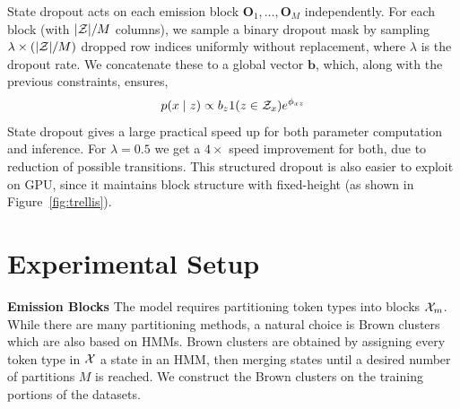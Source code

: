 \documentclass[11pt,a4paper]{article}
\begin{document}
State dropout acts on each emission block $\mathbf{O}_1, \ldots, \mathbf{O}_M$ independently.
For each block (with $|{\cal Z}| / M$ columns), we sample a binary dropout mask by sampling
$ \lambda \times(|{\cal Z}| / M)$ dropped row indices uniformly without replacement,
where $\lambda$ is the dropout rate.
We concatenate these to a global vector $\mathbf{b}$, which, along with the previous constraints, 
ensures,
\begin{equation}
\label{eqn:state_dropout}
p(x \mid z) \propto b_{z}1(z \in \mathcal{Z}_x)e^{\phi_{xz}}
\end{equation}
State dropout gives a large practical speed up for both parameter computation and inference.
For $\lambda=0.5$ we get a $4\times$ speed improvement for both,
due to reduction of possible transitions.
This structured dropout is also easier to exploit on GPU,
since it maintains block structure with fixed-height (as shown in Figure~\ref{fig:trellis}).









\section{Experimental Setup}
\label{sec:experiments}

\textbf{Emission Blocks}
The model requires partitioning token types into blocks $\mathcal{X}_m$. 
While there are many partitioning methods, a natural choice
is Brown clusters \citep{brown1992,liang2005brown} which are also based on HMMs.
Brown clusters are obtained by assigning every token type in $\mathcal{X}$ a state in an HMM,
then merging states until a desired number of partitions $M$ is reached.
We construct the Brown clusters on the training portions of the datasets.
\end{document}
